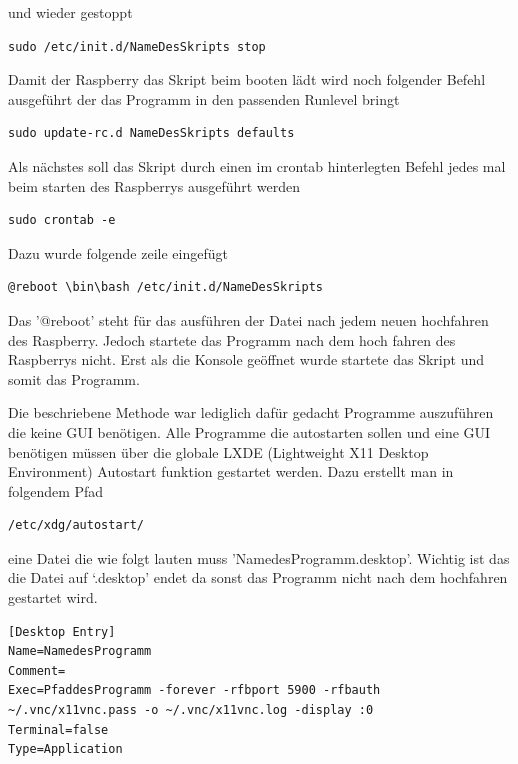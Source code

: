 \documentclass[11pt,a4paper]{article} %
\begin{document}
und wieder gestoppt
\begin{frame}

\begin{lstlisting}
sudo /etc/init.d/NameDesSkripts stop
\end{lstlisting}
\end{frame}

Damit der Raspberry das Skript beim booten lädt wird noch folgender Befehl ausgeführt der das Programm in den passenden Runlevel bringt
\begin{frame}

\begin{lstlisting}
sudo update-rc.d NameDesSkripts defaults
\end{lstlisting}
\end{frame}
\par

Als nächstes soll das Skript durch einen im crontab hinterlegten Befehl jedes mal beim starten des Raspberrys ausgeführt werden
\begin{frame}

\begin{lstlisting}
sudo crontab -e
\end{lstlisting}
\end{frame}
\newpage
Dazu wurde folgende zeile eingefügt
\begin{frame}

\begin{lstlisting}
@reboot \bin\bash /etc/init.d/NameDesSkripts
\end{lstlisting}
\end{frame}
Das '@reboot' steht für das ausführen der Datei nach jedem neuen hochfahren des Raspberry. Jedoch startete das Programm nach dem hoch fahren des Raspberrys nicht. Erst als die Konsole geöffnet wurde startete das Skript und somit das Programm.
\par
Die beschriebene Methode war lediglich dafür gedacht Programme auszuführen die keine GUI benötigen. Alle Programme die autostarten sollen und eine GUI benötigen müssen über die globale LXDE (Lightweight X11 Desktop Environment) Autostart funktion gestartet werden. \cite{12}
Dazu erstellt man in folgendem Pfad
\begin{frame}

\begin{lstlisting}
/etc/xdg/autostart/
\end{lstlisting}
\end{frame}
eine Datei die wie folgt lauten muss 'NamedesProgramm.desktop'. Wichtig ist das die Datei auf `.desktop' endet da sonst das Programm nicht nach dem hochfahren gestartet wird.
\begin{frame}

\begin{lstlisting}
[Desktop Entry]
Name=NamedesProgramm
Comment=
Exec=PfaddesProgramm -forever -rfbport 5900 -rfbauth ~/.vnc/x11vnc.pass -o ~/.vnc/x11vnc.log -display :0
Terminal=false
Type=Application
\end{lstlisting}
\end{frame}
\end{document}
